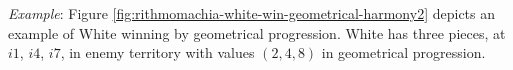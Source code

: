 \documentclass[12pt]{article}
\begin{document}


\noindent
{\it Example}:
Figure \ref{fig:rithmomachia-white-win-geometrical-harmony2} depicts an
example of White winning by geometrical progression.
White has three pieces, at $i1$, $i4$, $i7$,
in enemy territory with values $(2, 4, 8)$ in geometrical progression.
\end{document}
